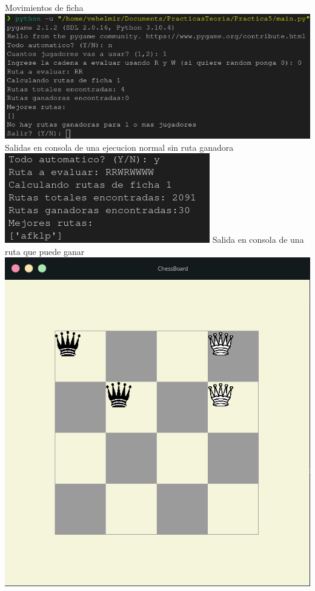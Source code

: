 \documentclass{article}
\begin{document}
\begin{center}
    Movimientos de ficha
    \includegraphics[width=\textwidth]{Practica7-capt3.png}
    Salidas en consola de una ejecucion normal sin ruta ganadora
    \includegraphics[width=\textwidth]{Practica7-capt4.png}
    Salida en consola de una ruta que puede ganar
    \includegraphics[width=\textwidth]{Practica7-capt5.png}

\end{center}
\end{document}

